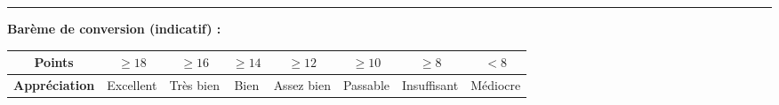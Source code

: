 \documentclass[12pt,a4paper]{article}
\begin{document}
\noindent\rule{\textwidth}{0.4pt}

\bigskip

\noindent\textbf{Barème de conversion (indicatif) :}

\medskip
\begin{center}
\begin{tabular}{|c|c|c|c|c|c|c|c|}
    \hline
    \textbf{Points} & $\geq 18$ & $\geq 16$ & $\geq 14$ & $\geq 12$ & $\geq 10$ & $\geq 8$ & $< 8$ \\
    \hline
    \textbf{Appréciation} & Excellent & Très bien & Bien & Assez bien & Passable & Insuffisant & Médiocre \\
    \hline
\end{tabular}
\end{center}
\end{document}
